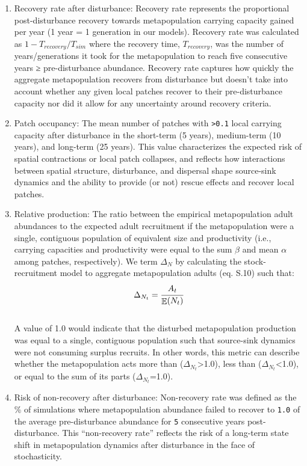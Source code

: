 \documentclass[
]{article}
\begin{document}
\begin{enumerate}
\def\labelenumi{\arabic{enumi}.}
\item
  Recovery rate after disturbance: Recovery rate represents the
  proportional post-disturbance recovery towards metapopulation carrying
  capacity gained per year (1 year = 1 generation in our models).
  Recovery rate was calculated as \(1-T_{recovery}/T_{sim}\) where the
  recovery time, \(T_{recovery}\), was the number of years/generations
  it took for the metapopulation to reach five consecutive years ≥
  pre-disturbance abundance. Recovery rate captures how quickly the
  aggregate metapopulation recovers from disturbance but doesn't take
  into account whether any given local patches recover to their
  pre-disturbance capacity nor did it allow for any uncertainty around
  recovery criteria.
\item
  Patch occupancy: The mean number of patches with
  \texttt{\textgreater{}0.1} local carrying capacity after disturbance
  in the short-term (5 years), medium-term (10 years), and long-term (25
  years). This value characterizes the expected risk of spatial
  contractions or local patch collapses, and reflects how interactions
  between spatial structure, disturbance, and dispersal shape
  source-sink dynamics and the ability to provide (or not) rescue
  effects and recover local patches.
\item
  Relative production: The ratio between the empirical metapopulation
  adult abundances to the expected adult recruitment if the
  metapopulation were a single, contiguous population of equivalent size
  and productivity (i.e., carrying capacities and productivity were
  equal to the sum \(\beta\) and mean \(\alpha\) among patches,
  respectively). We term \(\Delta_{N}\) by calculating the
  stock-recruitment model to aggregate metapopulation adults (eq. S.10)
  such that:\\
  \begin{align}
  \Delta_{N_t}=\cfrac{A_t}{\mathop{\mathrm{\mathbb{E}}}(N_t)}
  \end{align}\\
  A value of 1.0 would indicate that the disturbed metapopulation
  production was equal to a single, contiguous population such that
  source-sink dynamics were not consuming surplus recruits. In other
  words, this metric can describe whether the metapopulation acts more
  than (\(\Delta_{N_t}\)\textgreater1.0), less than
  (\(\Delta_{N_t}\)\textless1.0), or equal to the sum of its parts
  (\(\Delta_{N_t}\)=1.0).
\item
  Risk of non-recovery after disturbance: Non-recovery rate was defined
  as the \% of simulations where metapopulation abundance failed to
  recover to \texttt{1.0} of the average pre-disturbance abundance for
  \texttt{5} consecutive years post-disturbance. This ``non-recovery
  rate'' reflects the risk of a long-term state shift in metapopulation
  dynamics after disturbance in the face of stochasticity.
\end{enumerate}
\end{document}
